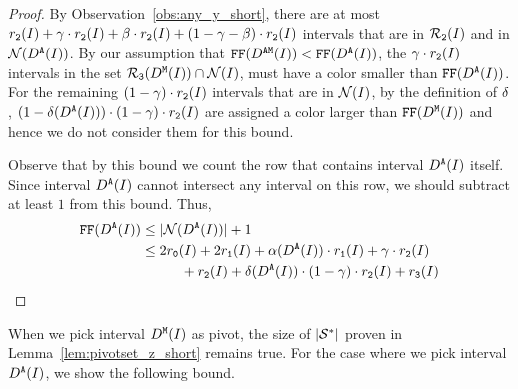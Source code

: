 {\begin{proof}
    By Observation~\ref{obs:any_y_short}, there are at most $r_\texttt{2}(I) + \gamma \cdot r_\texttt{2}(I) + \beta \cdot r_\texttt{2}(I) + (1 - \gamma - \beta) \cdot r_\texttt{2}(I)$ intervals that are in $\mathcal{R}_\texttt{2}(I)$ and in $\mathcal{N}(D^\texttt{A}(I))$.
    By our assumption that $\text{\texttt{FF}}(D^\texttt{AM}(I)) < \text{\texttt{FF}}(D^\texttt{A}(I))$, the $\gamma  \cdot r_\texttt{2}(I)$ intervals in the set $\mathcal{R}_\texttt{3}(D^\texttt{M}(I)) \cap \mathcal{N}(I)$, must have a color smaller than $\text{\texttt{FF}}(D^\texttt{A}(I))$.
    For the remaining $(1 - \gamma) \cdot r_\texttt{2}(I)$ intervals that are in $\mathcal{N}(I)$, by the definition of $\delta$,  $(1 - \delta(D^\texttt{A}(I))) \cdot (1 - \gamma) \cdot r_\texttt{2}(I)$ are assigned a color larger than $\text{\texttt{FF}}(D^\texttt{M}(I))$ and hence we do not consider them for this bound.
    
    Observe that by this bound we count the row that contains interval $D^\texttt{A}(I)$ itself.
    Since interval $D^\texttt{A}(I)$ cannot intersect any interval on this row, we should subtract at least $1$ from this bound. 
    Thus,
    \begin{align*}
            \text{\texttt{FF}}(D^\texttt{A}(I)) &\leq |\mathcal{N}(D^\texttt{A}(I))| + 1\\
            &\leq 2r_\texttt{0}(I) + 2r_\texttt{1}(I) + \alpha(D^\texttt{A}(I)) \cdot r_\texttt{1}(I) + \gamma  \cdot r_\texttt{2}(I) \\&\hspace{1cm} + r_\texttt{2}(I) + \delta(D^\texttt{A}(I)) \cdot (1 - \gamma ) \cdot r_\texttt{2}(I) + r_\texttt{3}(I)
        \end{align*}    
\end{proof}

When we pick interval $D^\texttt{M}(I)$ as pivot, the size of $|\mathcal{S}^*|$ proven in Lemma~\ref{lem:pivotset_z_short} remains true.
For the case where we pick interval $D^\texttt{A}(I)$, we show the following bound.

}

